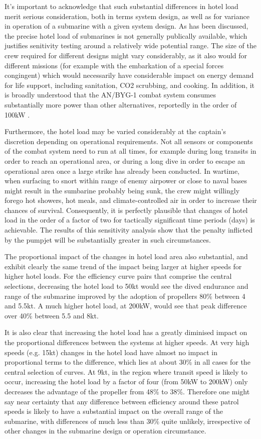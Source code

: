 \documentclass{article}\usepackage[]{graphicx}\usepackage[]{color}
\begin{document}
It's important to acknowledge that such substantial differences in hotel load merit serious consideration, both in terms system design, as well as for variance in operation of a submarine with a given system design.  As has been discussed, the precise hotel load of submarines is not generally publically available, which justifies senitivity testing around a relatively wide potential range.  The size of the crew required for different designs might vary considerably, as it also would for different missions (for example with the embarkation of a special forces congingent) which would necessarily have considerable impact on energy demand for life support, including sanitation, CO2 scrubbing, and cooking. In addition, it is broadly understood that the AN/BYG-1 combat system consumes substantially more power than other alternatives, reportedly in the order of 100kW \parencite{patrick2011}.

Furthermore, the hotel load may be varied considerably at the captain's discretion depending on operational requirements.  Not all sensors or components of the combat system need to run at all times, for example during long transits in order to reach an operational area, or during a long dive in order to escape an operational area once a large strike has already been conducted.  In wartime, when surfacing to snort within range of enemy airpower or close to naval bases might result in the sumbarine probably being sunk, the crew might willingly forego hot showers, hot meals, and climate-controlled air in order to increase their chances of survival.  Consequently, it is perfectly plausible that changes of hotel load in the order of a factor of two for tactically significant time periods (days) is achievable.  The results of this sensitivity analysis show that the penalty inflicted by the pumpjet will be substantially greater in such circumstances.

The proportional impact of the changes in hotel load area also substantial, and exhibit clearly the same trend of the impact being larger at higher speeds for higher hotel loads. For the efficiency curve pairs that comprise the central selections, decreasing the hotel load to 50kt would see the dived endurance and range of the submarine improved by the adoption of propellers 80\% between 4 and 5.5kt. A much higher hotel load, at 200kW, would see that peak difference over 40\% between 5.5 and 8kt.

It is also clear that increasing the hotel load has a greatly diminised impact on the proportional differences between the systems at higher speeds.  At very high speeds (e.g. 15kt) changes in the hotel load have almost no impact in proportional terms to the difference, which lies at about 30\% in all cases for the central selection of curves. At 9kt, in the region where transit speed is likely to occur, increasing the hotel load by a factor of four (from 50kW to 200kW) only decreases the advantage of the propeller from 48\% to 38\%. Therefore one might say near certainty that any difference between efficiency around these patrol speeds is likely to have a substantial impact on the overall range of the submarine, with differences of much less than 30\% quite unlikely, irrespective of other changes in the submarine design or operation circumstance.
\end{document}
